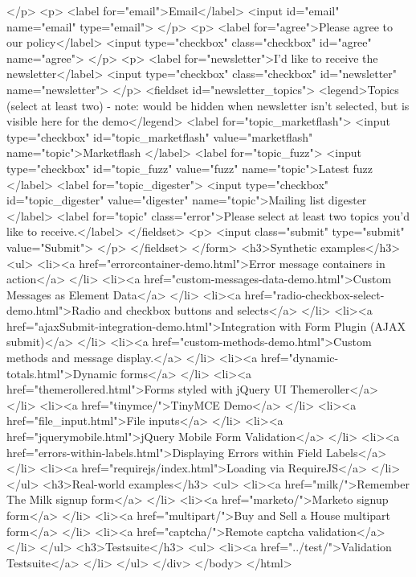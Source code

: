 {{{			</p>
			<p>
				<label for="email">Email</label>
				<input id="email" name="email" type="email">
			</p>
			<p>
				<label for="agree">Please agree to our policy</label>
				<input type="checkbox" class="checkbox" id="agree" name="agree">
			</p>
			<p>
				<label for="newsletter">I'd like to receive the newsletter</label>
				<input type="checkbox" class="checkbox" id="newsletter" name="newsletter">
			</p>
			<fieldset id="newsletter_topics">
				<legend>Topics (select at least two) - note: would be hidden when newsletter isn't selected, but is visible here for the demo</legend>
				<label for="topic_marketflash">
					<input type="checkbox" id="topic_marketflash" value="marketflash" name="topic">Marketflash
				</label>
				<label for="topic_fuzz">
					<input type="checkbox" id="topic_fuzz" value="fuzz" name="topic">Latest fuzz
				</label>
				<label for="topic_digester">
					<input type="checkbox" id="topic_digester" value="digester" name="topic">Mailing list digester
				</label>
				<label for="topic" class="error">Please select at least two topics you'd like to receive.</label>
			</fieldset>
			<p>
				<input class="submit" type="submit" value="Submit">
			</p>
		</fieldset>
	</form>
	<h3>Synthetic examples</h3>
	<ul>
		<li><a href="errorcontainer-demo.html">Error message containers in action</a>
		</li>
		<li><a href="custom-messages-data-demo.html">Custom Messages as Element Data</a>
		</li>
		<li><a href="radio-checkbox-select-demo.html">Radio and checkbox buttons and selects</a>
		</li>
		<li><a href="ajaxSubmit-integration-demo.html">Integration with Form Plugin (AJAX submit)</a>
		</li>
		<li><a href="custom-methods-demo.html">Custom methods and message display.</a>
		</li>
		<li><a href="dynamic-totals.html">Dynamic forms</a>
		</li>
		<li><a href="themerollered.html">Forms styled with jQuery UI Themeroller</a>
		</li>
		<li><a href="tinymce/">TinyMCE Demo</a>
		</li>
		<li><a href="file_input.html">File inputs</a>
		</li>
		<li><a href="jquerymobile.html">jQuery Mobile Form Validation</a>
		</li>
		<li><a href="errors-within-labels.html">Displaying Errors within Field Labels</a>
		</li>
		<li><a href="requirejs/index.html">Loading via RequireJS</a>
		</li>
	</ul>
	<h3>Real-world examples</h3>
	<ul>
		<li><a href="milk/">Remember The Milk signup form</a>
		</li>
		<li><a href="marketo/">Marketo signup form</a>
		</li>
		<li><a href="multipart/">Buy and Sell a House multipart form</a>
		</li>
		<li><a href="captcha/">Remote captcha validation</a>
		</li>
	</ul>
	<h3>Testsuite</h3>
	<ul>
		<li><a href="../test/">Validation Testsuite</a>
		</li>
	</ul>
</div>
</body>
</html>



}}}
